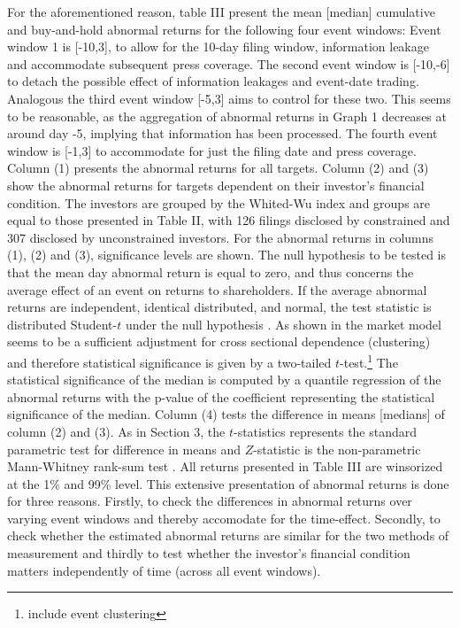 \documentclass[12pt]{article}
\begin{document}
For the aforementioned reason, table III present the mean [median] cumulative and buy-and-hold abnormal returns for the following four event windows: Event window 1 is [-10,3], to allow for the 10-day filing window, information leakage and accommodate subsequent press coverage. The second event window is [-10,-6] to detach the possible effect of information leakages and event-date trading. Analogous the third event window [-5,3] aims to control for these two. This seems to be reasonable, as the aggregation of abnormal returns in Graph 1 decreases at around day -5, implying that information has been processed. The fourth event window is [-1,3] to accommodate for just the filing date and press coverage. \\ 
Column (1) presents the abnormal returns for all targets. Column (2) and (3) show the abnormal returns for targets dependent on their investor's financial condition. The investors are grouped by the Whited-Wu index and groups are equal to those presented in Table II, with 126 filings disclosed by constrained and 307 disclosed by unconstrained investors. For the abnormal returns in columns (1), (2) and (3), significance levels are shown. The null hypothesis to be tested is that the mean day abnormal return is equal to zero, and thus concerns the average effect of an event on returns to shareholders. If the average abnormal returns are independent, identical distributed, and normal, the test statistic is distributed Student-$t$ under the null hypothesis \citep[p.7]{Brown1985}. As shown in \citet[p.22]{Brown1985} the market model seems to be a sufficient adjustment for cross sectional dependence (clustering) and therefore statistical significance is given by a two-tailed $t$-test.\footnote{include event clustering } The statistical significance of the median is computed by a quantile regression of the abnormal returns with the p-value of the coefficient representing the statistical significance of the median.  Column (4) tests the difference in means [medians] of column (2) and (3). As in Section 3, the $t$-statistics represents the standard parametric test for difference in means and $Z$-statistic is the non-parametric Mann-Whitney rank-sum test .
All returns  presented in Table III are winsorized at the 1\% and 99\% level. This extensive presentation of abnormal returns is done for three reasons. Firstly, to check the differences in abnormal returns over varying event windows and thereby accomodate for the time-effect. Secondly, to check whether the estimated abnormal returns are similar for the two methods of measurement and thirdly to test whether the investor's financial condition matters independently of time (across all event windows).
\end{document}
